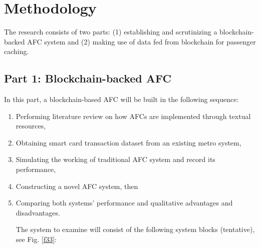 \documentclass[a4paper,12pt,oneside, utf8x]{report}
\begin{document}
\section{Methodology}
The research consists of two parts: (1) establishing and scrutinizing a blockchain-backed AFC system and (2) making use of data fed from blockchain for passenger caching.
\subsection{Part 1: Blockchain-backed AFC}
In this part, a blockchain-based AFC will be built in the following sequence:
\begin{enumerate}
\item Performing literature review on how AFCs are implemented through textual resources,
\item Obtaining smart card transaction dataset from an existing metro system,
\item Simulating the working of traditional AFC system and record its performance,
\item Constructing a novel AFC system, then
\item Comparing both systems’ performance and qualitative advantages and disadvantages.

The system to examine will consist of the following system blocks (tentative), see Fig. \ref{f33}:


\end{enumerate}
\end{document}
